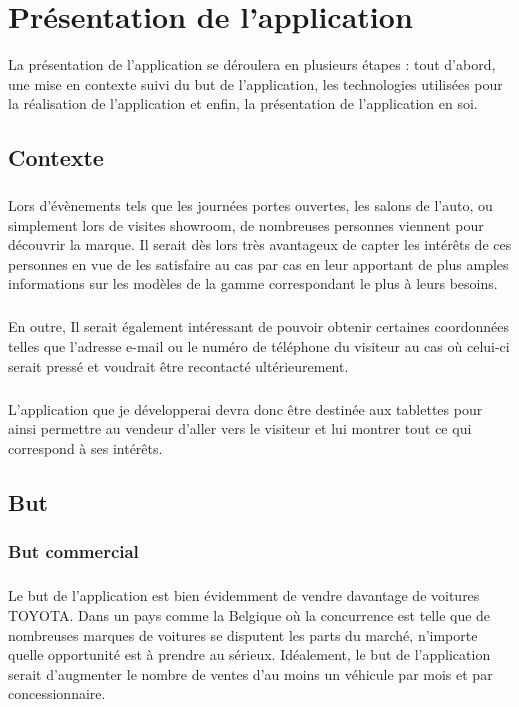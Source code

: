 \documentclass[12pt]{report}
\begin{document}
\chapter{Présentation de l'application}
La présentation de l'application se déroulera en plusieurs étapes : tout d'abord, une mise en contexte suivi du but de l'application, les technologies utilisées pour la réalisation de l'application et enfin, la présentation de l'application en soi.

\section{Contexte}
\paragraph{}
Lors d'évènements tels que les journées portes ouvertes, les salons de l'auto, ou simplement lors de visites showroom, de nombreuses personnes viennent pour découvrir la marque. 
Il serait dès lors très avantageux de capter les intérêts de ces personnes en vue de les satisfaire au cas par cas en leur apportant de plus amples informations sur les modèles de la gamme correspondant le plus à leurs besoins.

\paragraph{}
En outre, Il serait également intéressant de pouvoir obtenir certaines coordonnées telles que l'adresse e-mail ou le  numéro de téléphone du visiteur au cas où celui-ci serait pressé et voudrait être recontacté ultérieurement.

\paragraph{}
L'application que je développerai devra donc être destinée aux tablettes pour ainsi permettre au vendeur d'aller vers le visiteur et lui montrer tout ce qui correspond à ses intérêts.

\section{But}
\subsection{But commercial}
\paragraph{}
Le but de l'application est bien évidemment de vendre davantage de voitures TOYOTA. Dans un pays comme la Belgique où la concurrence est telle que de nombreuses marques de voitures se disputent les parts du marché, n'importe quelle opportunité est à prendre au sérieux. Idéalement, le but de l'application serait d'augmenter le nombre de ventes d'au moins un véhicule par mois et par concessionnaire.
\end{document}

